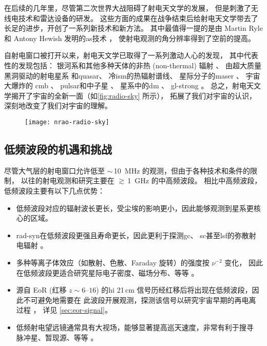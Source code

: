在后续的几年里，尽管第二次世界大战阻碍了射电天文学的发展，
但是刺激了无线电技术和雷达设备的研发。
这些方面的成果在战争结束后给射电天文学带去了长足的进步，开创了一系列新技术和新方法。
其中最值得一提的是由 Martin Ryle 和 Antony Hewish 发明的\ac{as}技术 \cite{ryle1960}，
使射电观测的角分辨率得到了空前的提高。

自射电窗口被打开以来，射电天文学已取得了一系列激动人心的发现，
其中代表性的发现包括：
银河系和其他多种天体的非热 (non-thermal) 辐射 \cite{reber1940}、
由超大质量黑洞驱动的射电星系\cite{baade1954}
和\ac{quasar}\cite{hazard1963,schmidt1963}、
冷\ac{ism}的热辐射谱线、
星际分子的\ac{maser} \cite{weaver1965}、
宇宙大爆炸的 \ac{cmb} \cite{penzias1965}、
\ac{pulsar}和中子星 \cite{hewish1968}、
星系中的\ac{dm} \cite{roberts1975}、
\ac{gl-strong} \cite{walsh1979}。
总之，射电天文学揭开了宇宙的全新一面（如\autoref{fig:radio-sky} 所示），
拓展了我们对宇宙的认识，深刻地改变了我们对宇宙的理解。

\begin{figure}[htp]
  \centering
  \texttt{[image: nrao-radio-sky]}
  \label{fig:radio-sky}
\end{figure}

\subsection{低频波段的机遇和挑战}

尽管大气层的射电窗口允许低至 $\sim$\,\SI{10}{\MHz} 的观测，但由于各种技术和条件的限制，
以往的射电观测和研究主要在 $\gtrsim$\,\SI{1}{\GHz} 的中高频波段。
相比中高频波段，低频波段主要有以下几点优势：
\begin{itemize}
  \item 低频波段对应的辐射波长更长，受尘埃的影响更小，因此能够观测到星系更核心的区域。
  \item \ac{rad-syn}在低频波段更强且寿命更长，因此更利于探测\ac{gc}、
    \ac{sc}甚至\ac{lsf}的弥散射电辐射 \cite{cassano2015,vazza2015,kale2016}。
  \item 多种等离子体效应（如散射、色散、Faraday 旋转）的强度按 $\nu^{-2}$ 变化，
    因此在低频波段更适合研究星际电子密度、磁场分布、等等
    \cite{johnston2015,roy2016,vanEck2017}。
  \item 源自 EoR (红移 $z \sim \numrange{6}{16}$)
    的\ac{hi} 21\,cm 信号历经红移后将出现在低频波段，因此不可避免地需要在
    此波段开展观测，探测该信号以研究宇宙早期的再电离过程
    \cite{mellema2013,mellema2015,koopmans2015}，
    详见 \autoref{sec:eor-signal}。
  \item 低频射电望远镜通常具有大视场，能够显著提高巡天速度，非常有利于搜寻
    脉冲星、暂现源、等等 \cite{stappers2011,fender2015}。
\end{itemize}

